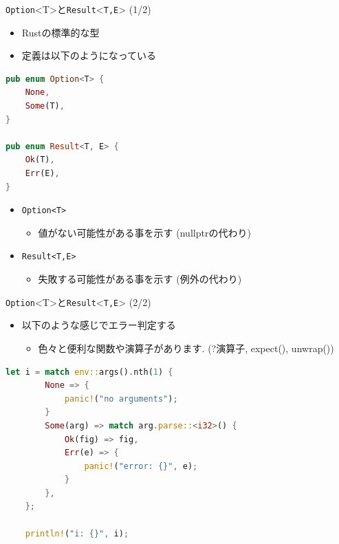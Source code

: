 \documentclass[cjk,dvipdfmx,10pt,compress,fragile%
hyperref={bookmarks=true,bookmarksnumbered=true,bookmarksopen=false,%
colorlinks=false,%
pdftitle={第 134 回 関西 Debian 勉強会},%
pdfauthor={小林},%
pdfsubject={資料},%
}]{beamer}
\begin{document}
\begin{frame}[t,fragile]{\texttt{Option}<T>と\texttt{Result}<\texttt{T,E}> (1/2)}
 \begin{itemize}
  \item Rustの標準的な型
  \item 定義は以下のようになっている
 \end{itemize}
\begin{lstlisting}[language=Rust,style=boxed,style=colouredRust,basicstyle=\small\tt,lineskip=-2pt]
pub enum Option<T> {
    None,
    Some(T),
}

pub enum Result<T, E> {
    Ok(T),
    Err(E),
}\end{lstlisting}
\begin{itemize}
  \item \verb|Option<T>|
	\begin{itemize}
	 \item 値がない可能性がある事を示す (nullptrの代わり)
	\end{itemize}
 \item \verb|Result<T,E>|
       \begin{itemize}
	\item 失敗する可能性がある事を示す (例外の代わり)
       \end{itemize}
\end{itemize}
\end{frame}

\begin{frame}[t,fragile]{\texttt{Option}<T>と\texttt{Result}<\texttt{T,E}> (2/2)}
 \begin{itemize}
  \item 以下のような感じでエラー判定する
	\begin{itemize}
	 \item 色々と便利な関数や演算子があります. (?演算子, expect(), unwrap())
	\end{itemize}
 \end{itemize}
\begin{lstlisting}[language=Rust,style=boxed,style=colouredRust,basicstyle=\small\tt,lineskip=-2pt]
    let i = match env::args().nth(1) {
        None => {
            panic!("no arguments");
        }
        Some(arg) => match arg.parse::<i32>() {
            Ok(fig) => fig,
            Err(e) => {
                panic!("error: {}", e);
            }
        },
    };

    println!("i: {}", i);
\end{lstlisting}
\end{frame}
\end{document}
